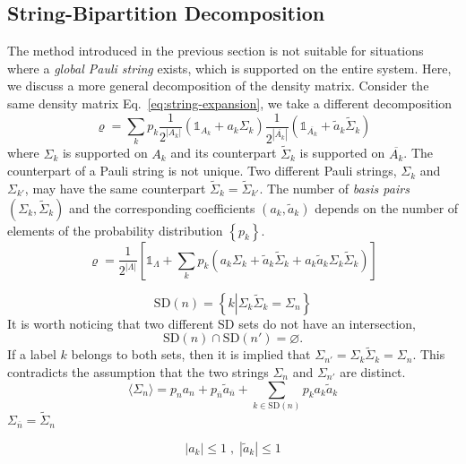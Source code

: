 \documentclass[12font]{article}
\numberwithin{equation}{section}    %
\theoremstyle{definition}
\newcommand{\anglelr}[1]{\langle #1 \rangle}
\newcommand{\lr}[1]{\left(  #1  \right)}
\newcommand{\lrm}[1]{\left[  #1  \right]}
\newcommand{\lrg}[1]{\left\{  #1  \right\}}
\newcommand{\abs}[1]{\left|  #1  \right|}
\newcommand{\mrm}[1]{\mathrm{#1}}
\begin{document}
\subsection{String-Bipartition Decomposition}
The method introduced in the previous section is not suitable for situations where a \textit{global Pauli string} exists, which is supported on the entire system. Here, we discuss a more general decomposition of the density matrix. Consider the same density matrix Eq.~\eqref{eq:string-expansion}, we take a different decomposition
\[
\varrho 
= 
\sum_{k} p_k
\frac{1}{2^{\abs{A_k}}}
\lr{\mathds{1}_{A_k} + a_k\Sigma_k}
\frac{1}{2^{\abs{\overline{A_k}}}}
\lr{\mathds{1}_{\overline{A_k}} + \tilde{a}_k\tilde{\Sigma}_k}
\]
where $\Sigma_k$ is supported on $A_k$ and its counterpart $\tilde{\Sigma}_k$ is supported on $\overline{A_k}$. The counterpart of a Pauli string is not unique. Two different Pauli strings, $\Sigma_k$ and $\Sigma_{k'
}$, may have the same counterpart $\tilde{\Sigma}_{k} = \tilde{\Sigma}_{k'}$. The number of \textit{basis pairs} $(\Sigma_k,\tilde{\Sigma}_k)$ and the corresponding coefficients $(a_k,\tilde{a}_k)$ depends on the number of elements of the probability distribution $\lrg{p_k}$.
\[
\varrho 
=
\frac{1}{2^{\abs{\Lambda}}}
\lrm{
\mathds{1}_{\Lambda}
+
\sum_{k} p_k
    \lr{
    a_k \Sigma_{k}
    +
    \tilde{a}_k\tilde{\Sigma}_k
    +
    a_k\tilde{a}_k\Sigma_k\tilde{\Sigma}_k
    }
}
\]

\[
\mrm{SD}(n) = \lrg{k \left| \Sigma_k\tilde{\Sigma}_k = \Sigma_n\right.}
\]
It is worth noticing that two different SD sets do not have an intersection,
\[
\mrm{SD}(n) \cap \mrm{SD}(n') = \varnothing.
\]
If a label $k$ belongs to both sets, then it is implied that $\Sigma_{n'} = \Sigma_k\tilde{\Sigma}_k = \Sigma_n$. This contradicts the assumption that the two strings $\Sigma_n$ and $\Sigma_{n'}$ are distinct.
\[
\anglelr{\Sigma_n} = p_na_n + p_{\overline{n}}\tilde{a}_{\overline{n}} 
+ 
\sum_{k\in \mrm{SD}(n)}p_ka_k\tilde{a}_k
\]
$\Sigma_{\overline{n}} = \tilde{\Sigma}_n$

\begin{equation}\label{eq:string-bipart-condition}
    \abs{a_k} \leq 1 \;,\; \abs{\tilde{a}_k} \leq 1
\end{equation}
\end{document}
